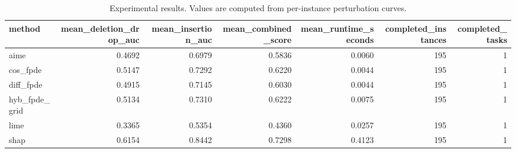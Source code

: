 \begin{table}[t]
\caption{Experimental results. Values are computed from per-instance perturbation curves.}
\label{tab:main_results_computed}
\centering
\begin{tabular}{lrrrrrr}
\toprule
method & mean\_deletion\_drop\_auc & mean\_insertion\_auc & mean\_combined\_score & mean\_runtime\_seconds & completed\_instances & completed\_tasks \\
\midrule
aime & 0.4692 & 0.6979 & 0.5836 & 0.0060 & 195 & 1 \\
cos\_fpde & 0.5147 & 0.7292 & 0.6220 & 0.0044 & 195 & 1 \\
diff\_fpde & 0.4915 & 0.7145 & 0.6030 & 0.0044 & 195 & 1 \\
hyb\_fpde\_grid & 0.5134 & 0.7310 & 0.6222 & 0.0075 & 195 & 1 \\
lime & 0.3365 & 0.5354 & 0.4360 & 0.0257 & 195 & 1 \\
shap & 0.6154 & 0.8442 & 0.7298 & 0.4123 & 195 & 1 \\
\bottomrule
\end{tabular}

\end{table}
